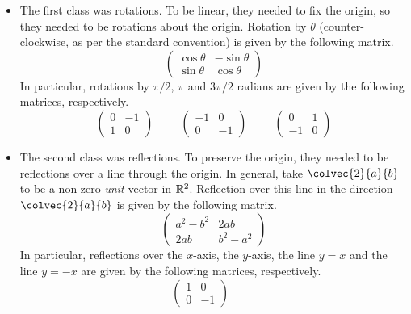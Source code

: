 \documentclass[fleqn,letterpaper]{report}
\begin{document}
\begin{itemize}
\item The first class was rotations. To be linear, they needed
to fix the origin, so they needed to be rotations about the
origin. Rotation by $\theta$ (counter-clockwise, as per the
standard convention) is given by the following matrix.
\begin{equation*}
\left( \begin{matrix}
\cos \theta & - \sin \theta \\
\sin \theta & \cos \theta
\end{matrix} \right) 
\end{equation*}
In particular, rotations by $\pi/2$, $\pi$ and $3\pi/2$ radians
are given by the following matrices, respectively.
\begin{equation*}
\left( \begin{matrix}
0 & -1 \\ 1 & 0 
\end{matrix} \right) 
\hspace{1cm}
\left( \begin{matrix}
-1 & 0 \\ 0 & -1
\end{matrix} \right) 
\hspace{1cm}
\left( \begin{matrix}
0 & 1 \\ -1 & 0 
\end{matrix} \right) 
\end{equation*}
\item The second class was reflections. To preserve the
origin, they needed to be reflections over a line through the
origin. In general, take $\colvec{2}{a}{b}$ to be a non-zero
\emph{unit} vector in $\mathbb{R}^2$.  Reflection over this line in
the direction $\colvec{2}{a}{b}$ is given by the following
matrix.
\begin{equation*}
\left( \begin{matrix}
a^2 - b^2 & 2ab \\
2ab & b^2 - a^2 
\end{matrix} \right) 
\end{equation*}
In particular, reflections over the $x$-axis, the $y$-axis,
the line $y=x$ and the line $y=-x$ are given by the following
matrices, respectively.
\begin{equation*}
\left( \begin{matrix}
1 & 0 \\ 0 & -1 
\end{matrix} \right) 
\hspace{1cm}

\end{equation*}
\end{itemize}
\end{document}
